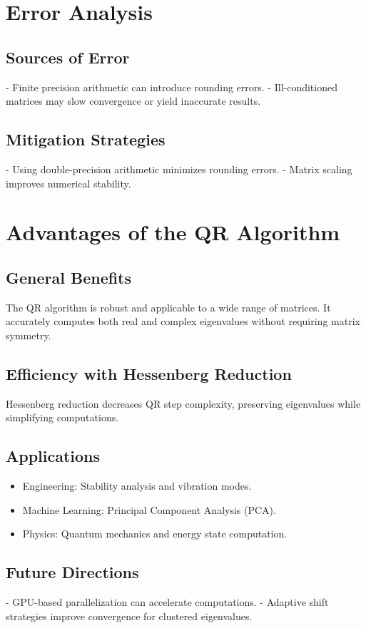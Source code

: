 \documentclass[12pt,a4paper]{article}
\begin{document}
\section{Error Analysis}
\subsection{Sources of Error}
- Finite precision arithmetic can introduce rounding errors.
- Ill-conditioned matrices may slow convergence or yield inaccurate results.

\subsection{Mitigation Strategies}
- Using double-precision arithmetic minimizes rounding errors.
- Matrix scaling improves numerical stability.

\section{Advantages of the QR Algorithm}
\subsection{General Benefits}
The QR algorithm is robust and applicable to a wide range of matrices. It accurately computes both real and complex eigenvalues without requiring matrix symmetry.

\subsection{Efficiency with Hessenberg Reduction}
Hessenberg reduction decreases QR step complexity, preserving eigenvalues while simplifying computations.

\subsection{Applications}
\begin{itemize}
    \item Engineering: Stability analysis and vibration modes.
    \item Machine Learning: Principal Component Analysis (PCA).
    \item Physics: Quantum mechanics and energy state computation.
\end{itemize}

\subsection{Future Directions}
- GPU-based parallelization can accelerate computations.
- Adaptive shift strategies improve convergence for clustered eigenvalues.
\end{document}
